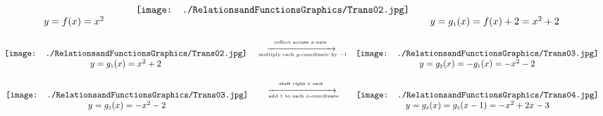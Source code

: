 \begin{ex}
\[\begin{array}{ccc}
&

\;\;\;\; \texttt{[image: ./RelationsandFunctionsGraphics/Trans02.jpg]} \\

y = f(x) = x^2 \;\;\;\; && \;\;\;\; y = g_{\mbox{\tiny$1$}}(x) = f(x) + 2 = x^2+2 \\

\end{array}\]



\[ \begin{array}{ccc}

\texttt{[image: ./RelationsandFunctionsGraphics/Trans02.jpg]}

&

\stackrel{\stackrel{\mbox{\tiny reflect across $x$-axis }}{\xrightarrow{\hspace{1in}}}}{\mbox{ \tiny multiply each $y$-coordinate by $-1$}} 

&

\texttt{[image: ./RelationsandFunctionsGraphics/Trans03.jpg]} \\

y = g_{\mbox{\tiny$1$}}(x) = x^2+2&& y = g_{\mbox{\tiny$2$}}(x) = -g_{\mbox{\tiny$1$}}(x)= -x^2 -2 \\

\end{array}\]



\[ \begin{array}{ccc}

\, \texttt{[image: ./RelationsandFunctionsGraphics/Trans03.jpg]} \;\;\;\,

&

\stackrel{\stackrel{\mbox{\tiny shift right $1$ unit }}{\xrightarrow{\hspace{1in}}}}{\mbox{ \tiny add $1$ to each $x$-coordinate}} 

&

\;\;\;\, \texttt{[image: ./RelationsandFunctionsGraphics/Trans04.jpg]} \\

\, y = g_{\mbox{\tiny$2$}}(x) = -x^2 -2 \;\;\;\, && \;\;\;\, y = g_{\mbox{\tiny$3$}}(x) = g_{\mbox{\tiny$2$}}(x-1) = -x^2+2x-3 \\

\end{array}\]


\[ \begin{array}{ccc}


\end{array}\]
\end{ex}
